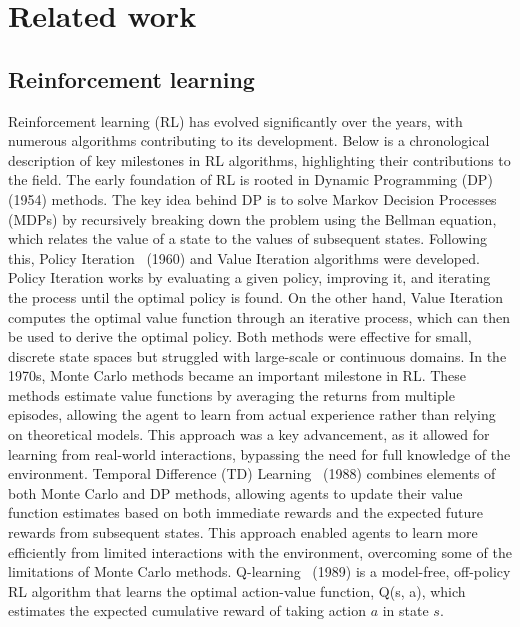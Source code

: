 \chapter{Related work}\label{chapter:related_works}

\section{Reinforcement learning} \label{section:related_works:rl}

Reinforcement learning (RL) has evolved significantly over the years, with numerous algorithms contributing to
its development.
Below is a chronological description of key milestones in RL algorithms, highlighting their contributions to the field.
The early foundation of RL is rooted in Dynamic Programming (DP)~\citep{bellman1954theory} (1954) methods.
The key idea behind DP is to solve Markov Decision Processes (MDPs) by recursively breaking down the problem using
the Bellman equation, which relates the value of a state to the values of subsequent states.
%
Following this, Policy Iteration~\citep{howard1960dynamic} (1960) and Value Iteration algorithms were developed.
Policy Iteration works by evaluating a given policy, improving it, and iterating the process until the optimal policy
is found.
On the other hand, Value Iteration computes the optimal value function through an iterative process, which can then
be used to derive the optimal policy.
%
Both methods were effective for small, discrete state spaces but struggled with large-scale or continuous domains.
In the 1970s, Monte Carlo methods became an important milestone in RL.
These methods estimate value functions by averaging the returns from multiple episodes, allowing the agent to learn
from actual experience rather than relying on theoretical models.
This approach was a key advancement, as it allowed for learning from real-world interactions, bypassing the need
for full knowledge of the environment.
Temporal Difference (TD) Learning~\citep{sutton1988learning} (1988) combines elements of both Monte Carlo and DP
methods, allowing agents to update their value function estimates based on both immediate rewards and the expected
future rewards from subsequent states.
This approach enabled agents to learn more efficiently from limited interactions with the environment,
overcoming some of the limitations of Monte Carlo methods.
%
Q-learning~\cite{watkins1989learning} (1989) is a model-free, off-policy RL algorithm that learns the optimal
action-value function, Q(s, a), which estimates the expected cumulative reward of taking action $a$ in state $s$.
